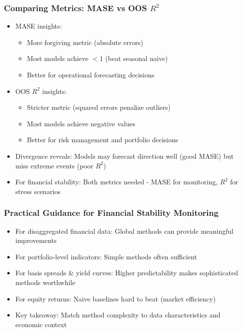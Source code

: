 \documentclass[ignorenonframetext, 9pt]{beamer}
\begin{document}
\begin{frame}
  \frametitle{Comparing Metrics: MASE vs OOS $R^2$}
  \begin{itemize}
  \item \alert{MASE insights:}
  \begin{itemize}
    \item More forgiving metric (absolute errors)
    \item Most models achieve $<1$ (beat seasonal naive)
    \item Better for operational forecasting decisions
  \end{itemize}
  \vspace{0.3cm}
  \item \alert{OOS $R^2$ insights:}
  \begin{itemize}
    \item Stricter metric (squared errors penalize outliers)
    \item Most models achieve negative values
    \item Better for risk management and portfolio decisions
  \end{itemize}
  \vspace{0.3cm}
  \item \alert{Divergence reveals:} Models may forecast direction well (good MASE) but miss extreme events (poor $R^2$)
  \vspace{0.3cm}
  \item \alert{For financial stability:} Both metrics needed - MASE for monitoring, $R^2$ for stress scenarios
  \end{itemize}
\end{frame}

\begin{frame}
  \frametitle{Practical Guidance for Financial Stability Monitoring}
  \begin{itemize}
  \item \alert{For disaggregated financial data:} Global methods can provide meaningful improvements
  \vspace{0.3cm}
  \item \alert{For portfolio-level indicators:} Simple methods often sufficient
  \vspace{0.3cm}
  \item \alert{For basis spreads \& yield curves:} Higher predictability makes sophisticated methods worthwhile
  \vspace{0.3cm}
  \item \alert{For equity returns:} Naive baselines hard to beat (market efficiency)
  \vspace{0.3cm}
  \item \alert{Key takeaway:} Match method complexity to data characteristics and economic context
  \end{itemize}
\end{frame}
\end{document}
